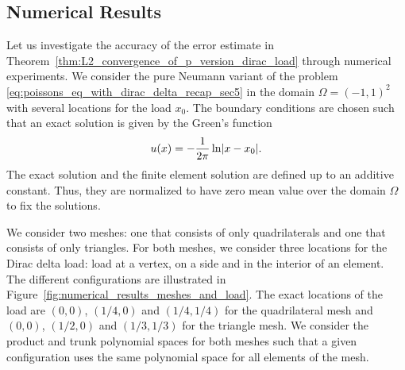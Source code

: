 \documentclass[english, 12pt, a4paper, sci, utf8, a-2b, online]{aaltothesis}
\theoremstyle{definition}
\theoremstyle{plain}
\DeclarePairedDelimiter\abs{\lvert}{\rvert}
\numberwithin{equation}{section}
\begin{document}
\subsection{Numerical Results}
\label{subsec:p_fem_numerical_L2_convergence}

Let us investigate the accuracy of the error estimate in
Theorem~\ref{thm:L2_convergence_of_p_version_dirac_load} through numerical experiments.
We consider the pure Neumann variant of the problem 
\eqref{eq:poissons_eq_with_dirac_delta_recap_sec5} in the domain $\Omega = (-1,1)^2$
with several locations for the load $x_0$. The boundary conditions are chosen such that
an exact solution is given by the Green's function
\begin{equation*}
    u(x) = -\frac{1}{2 \pi} \ln \abs{x - x_0}.
\end{equation*}
The exact solution and the finite element solution are defined up to an additive constant.
Thus, they are normalized to have zero mean value over the domain $\Omega$
to fix the solutions.

We consider two meshes: one that consists of only quadrilaterals and
one that consists of only triangles. For both meshes, we consider three locations
for the Dirac delta load: load at a vertex, on a side and in the interior of an element.
The different configurations are illustrated in Figure~\ref{fig:numerical_results_meshes_and_load}.
The exact locations of the load are $(0,0)$, $(1/4,0)$ and $(1/4,1/4)$
for the quadrilateral mesh and $(0,0)$, $(1/2,0)$ and $(1/3,1/3)$
for the triangle mesh.
We consider the product and trunk polynomial spaces for both meshes
such that a given configuration uses the same polynomial space for all elements of the mesh.
\end{document}

